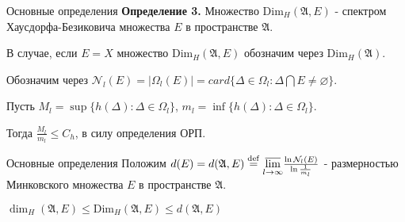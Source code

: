 \documentclass{beamer}
\begin{document}
% 
% 
% 
\begin{frame}{Основные определения}
    \textbf{Определение 3.} Множество $ \mbox{Dim}_H (\mathfrak{A}, E) $ -  спектром Хаусдорфа-Безиковича множества $E$ в пространстве $\mathfrak{A}$.
    
    В случае, если $ E=X $ множество
    $ \mbox{Dim}_H (\mathfrak{A}, E) $
    обозначим через $ \mbox{Dim}_H (\mathfrak{A})$.
    \newline
     
    Обозначим через $
    \mathcal{N}_l (E) =
    | \Omega_l (E) | =
    card \{ \Delta \in \Omega_l : \Delta \bigcap E \neq 
    {\varnothing}\} 
    $.
    
    Пусть
    $M_l = 
    \sup \{ h(\Delta) : \Delta \in \Omega_l \}$,
    $m_l =
    \inf \{ h(\Delta) : \Delta \in \Omega_l \}$.
    
    Тогда
    $
    \frac{M_l}{m_l} \leq C_h
    $, в силу определения ОРП.
\end{frame}

% 
%
\begin{frame}{Основные определения}
    Положим 
    $d(E) =
    d(\mathfrak{A}, E) \mathrel{\stackrel{\rm def}=}
    \underset{l \to \infty}{\overline{\lim}}
    \frac{\ln{\mathcal{N}_l (E)}}{\ln{\frac{1}
    {m_l}}}
    $ - размерностью Минковского множества $E$ 
    в пространстве $\mathfrak{A}$.
    \newline
    
    $\dim_H (\mathfrak{A}, E) \leq
    \mbox{Dim}_H (\mathfrak{A},E) \leq
    d(\mathfrak{A}, E)$
\end{frame}
\end{document}
